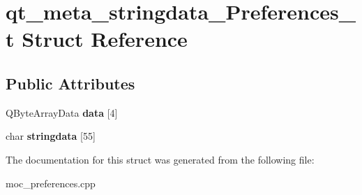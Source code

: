 \hypertarget{structqt__meta__stringdata__Preferences__t}{\section{qt\-\_\-meta\-\_\-stringdata\-\_\-\-Preferences\-\_\-t Struct Reference}
\label{structqt__meta__stringdata__Preferences__t}
}
\subsection*{Public Attributes}
\begin{DoxyCompactItemize}
\item 
\hypertarget{structqt__meta__stringdata__Preferences__t_ad385083c84284e407d51fdf5406d28ac}{Q\-Byte\-Array\-Data {\bfseries data} \mbox{[}4\mbox{]}}\label{structqt__meta__stringdata__Preferences__t_ad385083c84284e407d51fdf5406d28ac}

\item 
\hypertarget{structqt__meta__stringdata__Preferences__t_a475f5819c38ef927914e2c2f5ac2d895}{char {\bfseries stringdata} \mbox{[}55\mbox{]}}\label{structqt__meta__stringdata__Preferences__t_a475f5819c38ef927914e2c2f5ac2d895}

\end{DoxyCompactItemize}


The documentation for this struct was generated from the following file\-:\begin{DoxyCompactItemize}
\item 
moc\-\_\-preferences.\-cpp\end{DoxyCompactItemize}
